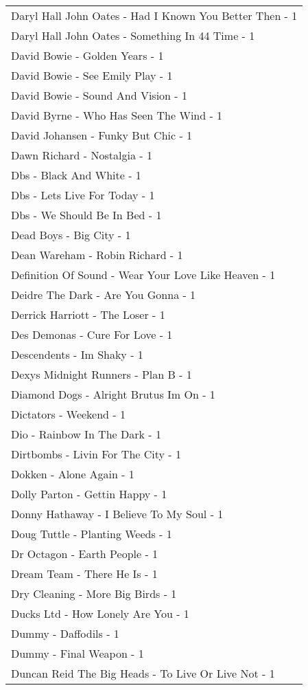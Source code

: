 \documentclass[
]{article}
\begin{document}
\begin{longtable}{l}
Daryl Hall John Oates - Had I Known You Better Then - 1 \\ 
Daryl Hall John Oates - Something In 44 Time - 1 \\ 
David Bowie - Golden Years - 1 \\ 
David Bowie - See Emily Play - 1 \\ 
David Bowie - Sound And Vision - 1 \\ 
David Byrne - Who Has Seen The Wind - 1 \\ 
David Johansen - Funky But Chic - 1 \\ 
Dawn Richard - Nostalgia - 1 \\ 
Dbs - Black And White - 1 \\ 
Dbs - Lets Live For Today - 1 \\ 
Dbs - We Should Be In Bed - 1 \\ 
Dead Boys - Big City - 1 \\ 
Dean Wareham - Robin Richard - 1 \\ 
Definition Of Sound - Wear Your Love Like Heaven - 1 \\ 
Deidre The Dark - Are You Gonna - 1 \\ 
Derrick Harriott - The Loser - 1 \\ 
Des Demonas - Cure For Love - 1 \\ 
Descendents - Im Shaky - 1 \\ 
Dexys Midnight Runners - Plan B - 1 \\ 
Diamond Dogs - Alright Brutus Im On - 1 \\ 
Dictators - Weekend - 1 \\ 
Dio - Rainbow In The Dark - 1 \\ 
Dirtbombs - Livin For The City - 1 \\ 
Dokken - Alone Again - 1 \\ 
Dolly Parton - Gettin Happy - 1 \\ 
Donny Hathaway - I Believe To My Soul - 1 \\ 
Doug Tuttle - Planting Weeds - 1 \\ 
Dr Octagon - Earth People - 1 \\ 
Dream Team - There He Is - 1 \\ 
Dry Cleaning - More Big Birds - 1 \\ 
Ducks Ltd - How Lonely Are You - 1 \\ 
Dummy - Daffodils - 1 \\ 
Dummy - Final Weapon - 1 \\ 
Duncan Reid The Big Heads - To Live Or Live Not - 1 \\ 

\end{longtable}
\end{document}
